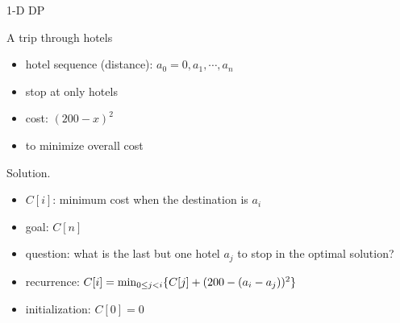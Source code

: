 \begin{frame}{1-D DP}
  \begin{exampleblock}{A trip through hotels }
    \begin{itemize}
      \item hotel sequence (distance): $a_{0} = 0, a_{1}, \cdots, a_{n}$
      \item stop at only hotels
      \item cost: $(200 - x)^{2}$ 
      \item to minimize overall cost
    \end{itemize}
  \end{exampleblock}

  \begin{block}{Solution.}
    \begin{itemize}
      \item $C[i]$: minimum cost when the destination is $a_{i}$
      \item goal: $C[n]$
      \item question: what is the last but one hotel $a_{j}$ to stop in the optimal solution?
      \item recurrence: $C[i] = \min_{0 \le j < i} \{C[j] + (200 - (a_{i} - a_{j}))^{2}\}$
      \item initialization: $C[0] = 0$
    \end{itemize}
  \end{block}
\end{frame}
